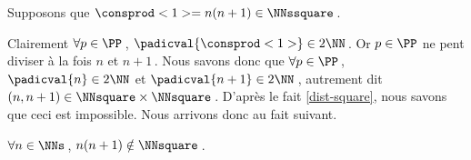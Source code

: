 Supposons que $\consprod<1> = n(n+1) \in \NNssquare$\,.

\medskip

Clairement $\forall p \in \PP$\,, $\padicval{\consprod<1>} \in 2 \NN$\,.
%
Or $p \in \PP$ ne pent diviser à la fois $n$ et $n+1$\,.
%
Nous savons donc que $\forall p \in \PP$\,, 
$\padicval{n} \in 2 \NN$ et $\padicval{n+1} \in 2 \NN$\,,
autrement dit 
$(n, n + 1) \in \NNsquare \times \NNsquare$\,.
D'après le fait \ref{dist-square}, nous savons que ceci est impossible.
%
Nous arrivons donc au fait suivant. 

\begin{fact}
	 $\forall n \in \NNs$\,, $n(n+1) \notin \NNsquare$\,.
\end{fact}